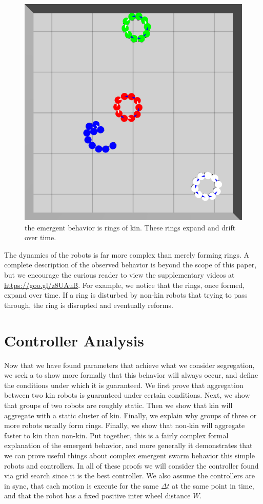 \documentclass[conference]{IEEEtran}
\begin{document}
    \begin{figure}
      \centering
      \includegraphics[width=0.7\linewidth]{./images/rings_example.png}
      \caption{the emergent behavior is rings of kin. These rings expand and drift over time.}
      \label{fig:rings}
    \end{figure}

    The dynamics of the robots is far more complex than merely forming rings. A complete description of the observed behavior is beyond the scope of this paper, but we encourage the curious reader to view the supplementary videos at \href{https://www.youtube.com/playlist?list=PL9HqYJ1IkIKVX9EsT5BY9LnBsBPTjc5bB}{https://goo.gl/z8UAuB}. For example, we notice that the rings, once formed, expand over time. If a ring is disturbed by non-kin robots that trying to pass through, the ring is disrupted and eventually reforms.

\section{Controller Analysis}

  Now that we have found parameters that achieve what we consider segregation, we seek a to show more formally that this behavior will always occur, and define the conditions under which it is guaranteed. We first prove that aggregation between two kin robots is guaranteed under certain conditions. Next, we show that groups of two robots are roughly static. Then we show that kin will aggregate with a static cluster of kin. Finally, we explain why groups of three or more robots usually form rings. Finally, we show that non-kin will aggregate faster to kin than non-kin. Put together, this is a fairly complex formal explanation of the emergent behavior, and more generally it demonstrates that we can prove useful things about complex emergent swarm behavior this simple robots and controllers. In all of these proofs we will consider the controller found via grid search since it is the best controller. We also assume the controllers are in sync, that each motion is execute for the same $\Delta t$ at the same point in time, and that the robot has a fixed positive inter wheel distance $W$.
\end{document}
